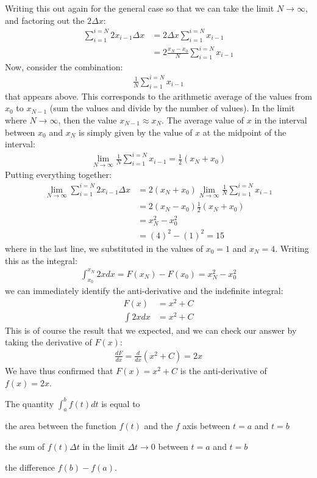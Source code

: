 Writing this out again for the general case so that we can take the limit $N\to\infty$, and factoring out the $2\Delta x$:
\begin{align*}
\sum_{i=1}^{i=N} 2x_{i-1} \Delta x &=2 \Delta x\sum_{i=1}^{i=N}x_{i-1}\\
&=2 \frac{x_N-x_0}{N}\sum_{i=1}^{i=N}x_{i-1}
\end{align*}
Now, consider the combination:
\begin{align*}
\frac{1}{N}\sum_{i=1}^{i=N}x_{i-1}
\end{align*}
that appears above. This corresponds to the arithmetic average of the values from $x_0$ to $x_{N-1}$ (sum the values and divide by the number of values). In the limit where $N\to \infty$, then the value $x_{N-1}\approx x_N$. The average value of $x$ in the interval between $x_0$ and $x_N$ is simply given by the value of $x$ at the midpoint of the interval:
\begin{align*}
\lim_{N\to\infty}\frac{1}{N}\sum_{i=1}^{i=N}x_{i-1}=\frac{1}{2}(x_N+x_0)
\end{align*}
Putting everything together:
\begin{align*}
\lim_{N\to\infty}\sum_{i=1}^{i=N} 2x_{i-1} \Delta x &=2 (x_N+x_0)\lim_{N\to\infty}\frac{1}{N}\sum_{i=1}^{i=N}x_{i-1}\\
&=2 (x_N-x_0)\frac{1}{2}(x_N+x_0)\\
&=x_N^2 - x_0^2\\
&=(4)^2 - (1)^2 = 15
\end{align*}
where in the last line, we substituted in the values of $x_0=1$ and $x_N=4$. Writing this as the integral:
\begin{align*}
\int_{x_0}^{x_N}2x dx=F(x_N) - F(x_0)=x_N^2 - x_0^2
\end{align*}
we can immediately identify the anti-derivative and the indefinite integral:
\begin{align*}
F(x) &= x^2 +C \\
\int 2xdx&=x^2 +C
\end{align*}
This is of course the result that we expected, and we can check our answer by taking the derivative of $F(x)$:
\begin{align*}
\frac{dF}{dx}=\frac{d}{dx}(x^2+C) = 2x
\end{align*}
We have thus confirmed that $F(x)=x^2+C$ is the anti-derivative of $f(x)=2x$.

\begin{checkpoint}
\begin{MCquestion}
{The quantity $\int_{a}^{b}f(t)dt$ is equal to}
\item the area between the function $f(t)$ and the $f$ axis between $t=a$ and $t=b$
\item the sum of $f(t)\Delta t$ in the limit $\Delta t\to 0$ between $t=a$ and $t=b$ \correct
\item the difference $f(b) - f(a)$.
\end{MCquestion}
\end{checkpoint}

